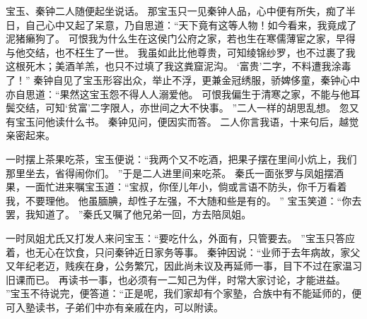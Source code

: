\par
宝玉、秦钟二人随便起坐说话。
那宝玉只一见秦钟人品，心中便有所失，痴了半日，自己心中又起了呆意，乃自思道：“天下竟有这等人物！如今看来，我竟成了泥猪癞狗了。
可恨我为什么生在这侯门公府之家，若也生在寒儒薄宦之家，早得与他交结，也不枉生了一世。
我虽如此比他尊贵，可知绫锦纱罗，也不过裹了我这根死木；美酒羊羔，也只不过填了我这粪窟泥沟。
‘富贵’二字，不料遭我涂毒了！”
秦钟自见了宝玉形容出众，举止不浮，更兼金冠绣服，骄婢侈童，秦钟心中亦自思道：“果然这宝玉怨不得人人溺爱他。
可恨我偏生于清寒之家，不能与他耳鬓交结，可知‘贫富’二字限人，亦世间之大不快事。
”二人一样的胡思乱想。
忽又有宝玉问他读什么书。
秦钟见问，便因实而答。
二人你言我语，十来句后，越觉亲密起来。
\par
一时摆上茶果吃茶，宝玉便说：“我两个又不吃酒，把果子摆在里间小炕上，我们那里坐去，省得闹你们。
”于是二人进里间来吃茶。
秦氏一面张罗与凤姐摆酒果，一面忙进来嘱宝玉道：“宝叔，你侄儿年小，倘或言语不防头，你千万看着我，不要理他。
他虽腼腆，却性子左强，不大随和些是有的。
”
宝玉笑道：“你去罢，我知道了。
”秦氏又嘱了他兄弟一回，方去陪凤姐。
\par
一时凤姐尤氏又打发人来问宝玉：“要吃什么，外面有，只管要去。
”宝玉只答应着，也无心在饮食，只问秦钟近日家务等事。
秦钟因说：“业师于去年病故，家父又年纪老迈，贱疾在身，公务繁冗，因此尚未议及再延师一事，目下不过在家温习旧课而已。
再读书一事，也必须有一二知己为伴，时常大家讨论，才能进益。
”宝玉不待说完，便答道：“正是呢，我们家却有个家塾，合族中有不能延师的，便可入塾读书，子弟们中亦有亲戚在内，可以附读。
